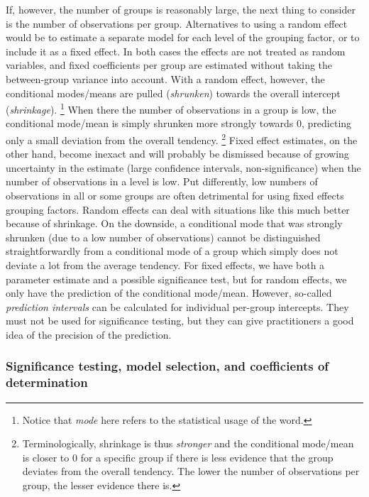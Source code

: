 If, however, the number of groups is reasonably large, the next thing to consider is the number of observations per group.
Alternatives to using a random effect would be to estimate a separate model for each level of the grouping factor, or to include it as a fixed effect.
In both cases the effects are not treated as random variables, and fixed coefficients per group are estimated without taking the between-group variance into account.
With a random effect, however, the conditional modes\slash means are pulled (\textit{shrunken}) towards the overall intercept (\textit{shrinkage}).%
\footnote{Notice that \textit{mode} here refers to the statistical usage of the word.}
When there the number of observations in a group is low, the conditional mode\slash mean is simply shrunken more strongly towards $0$, predicting only a small deviation from the overall tendency.%
\footnote{Terminologically, shrinkage is thus \textit{stronger} and the conditional mode\slash mean is closer to $0$ for a specific group if there is less evidence that the group deviates from the overall tendency.
The lower the number of observations per group, the lesser evidence there is.}
Fixed effect estimates, on the other hand, become inexact and will probably be dismissed because of growing uncertainty in the estimate (large confidence intervals, non-significance) when the number of observations in a level is low.
Put differently, low numbers of observations in all or some groups are often detrimental for using fixed effects grouping factors.
Random effects can deal with situations like this much better because of shrinkage.
On the downside, a conditional mode that was strongly shrunken (due to a low number of observations) cannot be distinguished straightforwardly from a conditional mode of a group which simply does not deviate a lot from the average tendency.
For fixed effects, we have both a parameter estimate and a possible significance test, but for random effects, we only have the prediction of the conditional mode\slash mean.
However, so-called \textit{prediction intervals} can be calculated for individual per-group intercepts.
They must not be used for significance testing, but they can give practitioners a good idea of the precision of the prediction.

\subsubsection{Significance testing, model selection, and coefficients of determination}
\label{sec:significancetestingandcoefficientsofdetermination}

